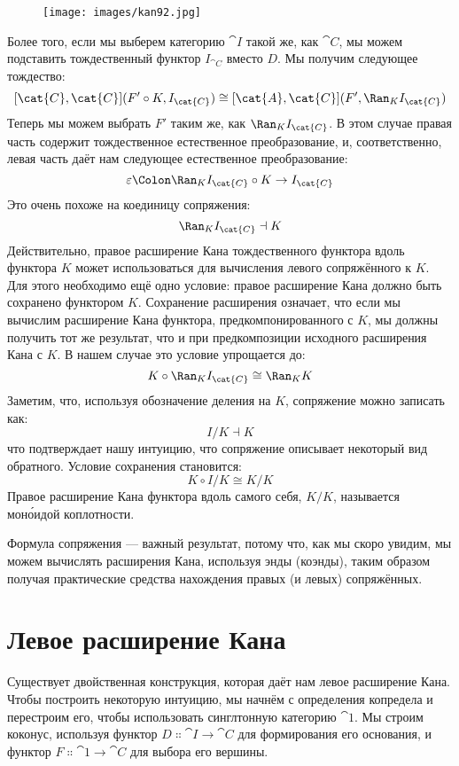 \begin{figure}[H]
  \centering
  \texttt{[image: images/kan92.jpg]}
\end{figure}

\noindent
Более того, если мы выберем категорию $\cat{I}$ такой же, как
$\cat{C}$, мы можем подставить тождественный функтор $I_{\cat{C}}$ вместо
$D$. Мы получим следующее тождество:
\[[\cat{C}, \cat{C}](F' \circ K, I_{\cat{C}}) \cong [\cat{A}, \cat{C}](F', \Ran_{K}I_{\cat{C}})\]
Теперь мы можем выбрать $F'$ таким же, как $\Ran_{K}I_{\cat{C}}$. В
этом случае правая часть содержит тождественное естественное
преобразование, и, соответственно, левая часть даёт нам
следующее естественное преобразование:
\[\varepsilon \Colon \Ran_{K}I_{\cat{C}} \circ K \to I_{\cat{C}}\]
Это очень похоже на коединицу сопряжения:
\[\Ran_{K}I_{\cat{C}} \dashv K\]
Действительно, правое расширение Кана тождественного функтора вдоль функтора
$K$ может использоваться для вычисления левого сопряжённого к $K$. Для
этого необходимо ещё одно условие: правое расширение Кана должно быть
сохранено функтором $K$. Сохранение расширения
означает, что если мы вычислим расширение Кана функтора, предкомпонированного
с $K$, мы должны получить тот же результат, что и при предкомпозиции
исходного расширения Кана с $K$. В нашем случае это условие
упрощается до:
\[K \circ \Ran_{K}I_{\cat{C}} \cong \Ran_{K}K\]
Заметим, что, используя обозначение деления на $K$, сопряжение можно
записать как:
\[I/K \dashv K\]
что подтверждает нашу интуицию, что сопряжение описывает некоторый вид
обратного. Условие сохранения становится:
\[K \circ I/K \cong K/K\]
Правое расширение Кана функтора вдоль самого себя, $K/K$,
называется моно́идой коплотности.

Формула сопряжения — важный результат, потому что, как мы скоро увидим,
мы можем вычислять расширения Кана, используя энды (коэнды), таким образом получая
практические средства нахождения правых (и левых) сопряжённых.

\section{Левое расширение Кана}

Существует двойственная конструкция, которая даёт нам левое расширение Кана. Чтобы
построить некоторую интуицию, мы начнём с определения копредела
и перестроим его, чтобы использовать синглтонную категорию $\cat{1}$. Мы строим
коконус, используя функтор $D \Colon \cat{I} \to \cat{C}$ для формирования его
основания, и функтор $F \Colon \cat{1} \to \cat{C}$ для выбора его вершины.

